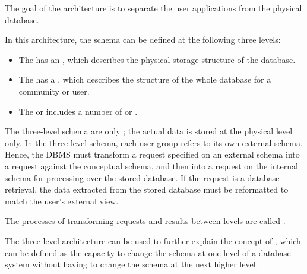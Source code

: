     \par The goal of the  architecture is to separate the user
      applications from the physical database.
    \par In this architecture, the schema can be defined at the following three
      levels:
      \begin{itemize}
        \item The  has an , which
          describes the physical storage structure of the database.
        \item The  has a , which
          describes the structure of the whole database for a community or
          user.
        \item The  or  includes a number of
           or .
      \end{itemize}
    \par The three-level schema are only ; the actual
      data is stored at the physical level only. In the three-level schema,
      each user group refers to its own external schema. Hence, the DBMS must
      transform a request specified on an external schema into a request
      against the conceptual schema, and then into a request on the internal
      schema for processing over the stored database. If the request is a
      database retrieval, the data extracted from the stored database must be
      reformatted to match the user's external view.
    \par The processes of transforming requests and results between levels are
    called .
  
    \par The three-level architecture can be used to further explain the
    concept of , which can be defined as the capacity to
    change the schema at one level of a database system without having to
    change the schema at the next higher level.
